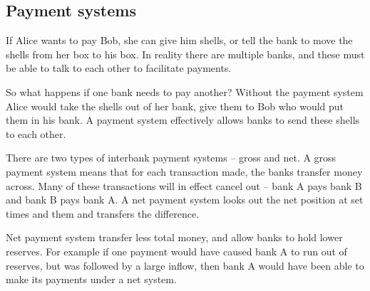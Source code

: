 
\subsection{Payment systems}

If Alice wants to pay Bob, she can give him shells, or tell the bank to move the shells from her box to his box. In reality there are multiple banks, and these must be able to talk to each other to facilitate payments.

So what happens if one bank needs to pay another? Without the payment system Alice would take the shells out of her bank, give them to Bob who would put them in his bank. A payment system effectively allows banks to send these shells to each other.

There are two types of interbank payment systems – gross and net. A gross payment system means that for each transaction made, the banks transfer money across. Many of these transactions will in effect cancel out – bank A pays bank B and bank B pays bank A. A net payment system looks out the net position at set times and them and transfers the difference.

Net payment system transfer less total money, and allow banks to hold lower reserves. For example if one payment would have caused bank A to run out of reserves, but was followed by a large inflow, then bank A would have been able to make its payments under a net system.

